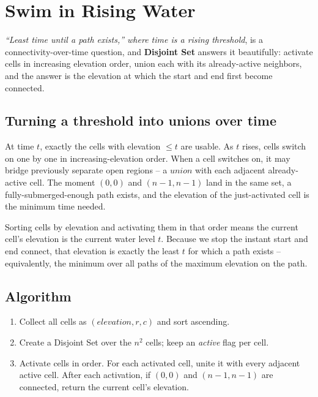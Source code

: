\section{Swim in Rising Water}
\label{sec:graph-swim-rising-water}


\begin{patternbox}
\emph{``Least time until a path exists,'' where time is a rising
threshold}, is a connectivity-over-time question, and
\textbf{Disjoint Set} answers it beautifully: activate cells in
increasing elevation order, union each with its already-active
neighbors, and the answer is the elevation at which the start and end
first become connected.
\end{patternbox}

\subsection*{Turning a threshold into unions over time}

At time $t$, exactly the cells with elevation $\le t$ are usable. As $t$
rises, cells switch on one by one in increasing-elevation order. When a
cell switches on, it may bridge previously separate open regions -- a
$\textit{union}$ with each adjacent already-active cell. The moment
$(0,0)$ and $(n-1,n-1)$ land in the same set, a fully-submerged-enough
path exists, and the elevation of the just-activated cell is the minimum
time needed.

\begin{ideabox}
Sorting cells by elevation and activating them in that order means the
current cell's elevation is the current water level $t$. Because we stop
the instant start and end connect, that elevation is exactly the least
$t$ for which a path exists -- equivalently, the minimum over all paths
of the maximum elevation on the path.
\end{ideabox}

\subsection*{Algorithm}

\begin{enumerate}
  \item Collect all cells as $(\textit{elevation}, r, c)$ and sort
        ascending.
  \item Create a Disjoint Set over the $n^2$ cells; keep an
        \textit{active} flag per cell.
  \item Activate cells in order. For each activated cell, unite it with
        every adjacent active cell. After each activation, if $(0,0)$
        and $(n-1,n-1)$ are connected, return the current cell's
        elevation.
\end{enumerate}

